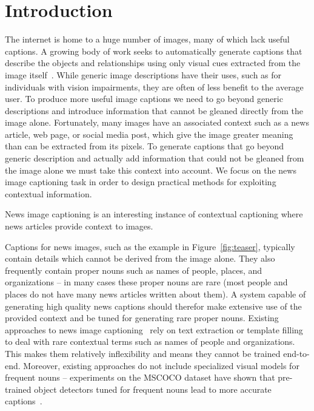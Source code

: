 
\section{Introduction}



The internet is home to a huge number of images, many of which lack useful
captions. A growing body of work seeks to automatically generate captions that
describe the objects and relationships using only visual cues extracted from
the image itself~\cite{Donahue2015LongTR, Vinyals2015ShowAT, Fang2015FromCT,
Karpathy2015DeepVA, Rennie2017SelfCriticalST, Lu2017KnowingWT,
Anderson2017BottomUpAT, Cornia2019ShowCT}. While generic image descriptions
have their uses, such as for individuals with vision impairments, they are
often of less benefit to the average user. To produce more useful image
captions we need to go beyond generic descriptions and introduce information
that cannot be gleaned directly from the image alone. Fortunately, many images
have an associated context such as a news article, web page, or social
media post, which give the image greater meaning than can be extracted from its
pixels. To generate captions that go beyond generic description and actually
add information that could not be gleaned from the image alone we must take
this context into account. We focus on the news image captioning task in order
to design practical methods for exploiting contextual information.


News image captioning is an interesting instance of contextual captioning
where news articles provide context to images.

Captions for news images, such as the example in Figure~\ref{fig:teaser},
typically contain details which cannot be derived from the image alone. They
also frequently contain proper nouns such as names of people, places, and
organizations -- in many cases these proper nouns are rare (most people and
places do not have many news articles written about them). A system capable of
generating high quality news captions should therefor make extensive use of the
provided context and be tuned for generating rare proper nouns. Existing
approaches to news image captioning~\cite{Tariq2017ACE,
Ramisa2016BreakingNewsAA,
	Biten2019GoodNews}  rely on text extraction or
template filling to deal with rare contextual terms such as names of people and
organizations. This makes them relatively inflexibility and means they cannot
be trained end-to-end. Moreover, existing approaches do not include specialized
visual models for frequent nouns -- experiments on the MSCOCO dataset have
shown
that pre-trained object detectors tuned for frequent nouns
lead to more accurate captions~\cite{}.


